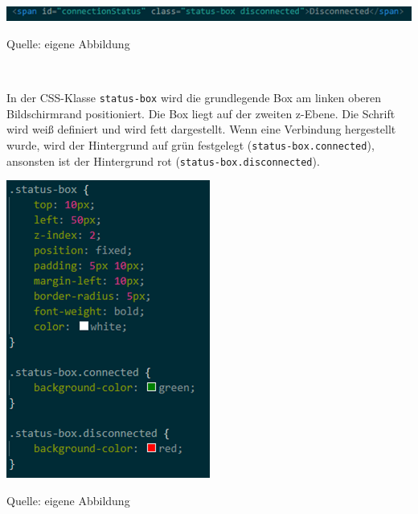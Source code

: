 \documentclass[ngerman,12pt,a4paper]{article}
\begin{document}
	\begin{center}
		\begin{minipage}[t]{1\textwidth}
			\includegraphics{Pictures/status-html}
			\label{fig:status-html}
			\vspace{-10pt}
			\begin{center}
				\par\small Quelle: eigene Abbildung 
			\end{center}
		\end{minipage} \\[0.75cm]
	\end{center}
	In der CSS-Klasse \texttt{status-box} wird die grundlegende Box am linken oberen Bildschirmrand positioniert. Die Box liegt auf der zweiten z-Ebene. Die Schrift wird weiß definiert und wird fett dargestellt. Wenn eine Verbindung hergestellt wurde, wird der Hintergrund auf grün festgelegt (\texttt{status-box.connected}), ansonsten ist der Hintergrund rot (\texttt{status-box.disconnected}). \\[0.5cm]
	\begin{center}
		\begin{minipage}[t]{0.45\textwidth}
			\includegraphics{Pictures/status-css}
			\label{fig:status-css}
			\vspace{-10pt}
			\begin{center}
				\par\small Quelle: eigene Abbildung 
			\end{center}
		\end{minipage} \\[0.75cm]
	\end{center}
\end{document}
